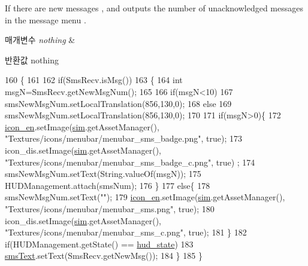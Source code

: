 If there are new messages , and outputs the number of unacknowledged messages in the message menu . 
\begin{DoxyParams}{매개변수}
{\em nothing} & \\
\hline
\end{DoxyParams}
\begin{DoxyReturn}{반환값}
nothing 
\end{DoxyReturn}

\begin{DoxyCode}
160   \{
161 
162     \textcolor{keywordflow}{if}(SmsRecv.isMsg())
163     \{
164       \textcolor{keywordtype}{int} msgN=SmsRecv.getNewMsgNum();
165 
166       \textcolor{keywordflow}{if}(msgN<10)
167         smsNewMsgNum.setLocalTranslation(856,130,0);
168       \textcolor{keywordflow}{else}
169         smsNewMsgNum.setLocalTranslation(856,130,0);
170 
171       \textcolor{keywordflow}{if}(msgN>0)\{
172         \hyperlink{classkr_1_1ac_1_1kookmin_1_1cs_1_1sms_1_1_sms_hud_a193c97d71fca49a82a8f4e9ba0fc7d5a}{icon\_en}.setImage(\hyperlink{classkr_1_1ac_1_1kookmin_1_1cs_1_1sms_1_1_sms_hud_af6e0bca70fb93df48b91fa40cf202ec0}{sim}.getAssetManager(), \textcolor{stringliteral}{"Textures/icons/menubar/menubar\_sms\_badge.png"}, \textcolor{keyword}{
      true});
173         icon\_dis.setImage(\hyperlink{classkr_1_1ac_1_1kookmin_1_1cs_1_1sms_1_1_sms_hud_af6e0bca70fb93df48b91fa40cf202ec0}{sim}.getAssetManager(), \textcolor{stringliteral}{"Textures/icons/menubar/menubar\_sms\_badge\_c.png"}, \textcolor{keyword}{true})
      ;
174         smsNewMsgNum.setText(String.valueOf(msgN));
175         HUDManagement.attach(smsNum);
176       \}
177       \textcolor{keywordflow}{else}\{
178         smsNewMsgNum.setText(\textcolor{stringliteral}{""});
179         \hyperlink{classkr_1_1ac_1_1kookmin_1_1cs_1_1sms_1_1_sms_hud_a193c97d71fca49a82a8f4e9ba0fc7d5a}{icon\_en}.setImage(\hyperlink{classkr_1_1ac_1_1kookmin_1_1cs_1_1sms_1_1_sms_hud_af6e0bca70fb93df48b91fa40cf202ec0}{sim}.getAssetManager(), \textcolor{stringliteral}{"Textures/icons/menubar/menubar\_sms.png"}, \textcolor{keyword}{true});
180         icon\_dis.setImage(\hyperlink{classkr_1_1ac_1_1kookmin_1_1cs_1_1sms_1_1_sms_hud_af6e0bca70fb93df48b91fa40cf202ec0}{sim}.getAssetManager(), \textcolor{stringliteral}{"Textures/icons/menubar/menubar\_sms\_c.png"}, \textcolor{keyword}{true});
181       \}
182       \textcolor{keywordflow}{if}(HUDManagement.getState() == \hyperlink{classkr_1_1ac_1_1kookmin_1_1cs_1_1sms_1_1_sms_hud_a7e4751ec05c3e04a3d43b617665397b8}{hud\_state})
183         \hyperlink{classkr_1_1ac_1_1kookmin_1_1cs_1_1sms_1_1_sms_hud_a6a1a2ed2311a25a2e28f6a527aec312f}{smsText}.setText(SmsRecv.getNewMsg());
184     \}
185   \}
\end{DoxyCode}


